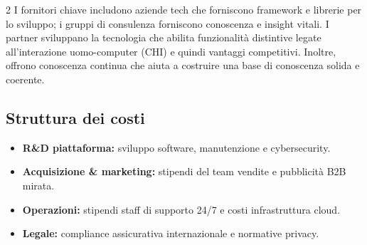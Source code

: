 \documentclass[10pt,a4paper]{scrartcl}
\begin{document}
\begin{multicols*}{2}
I fornitori chiave includono aziende tech che forniscono framework e librerie per lo sviluppo; i gruppi di consulenza forniscono conoscenza e insight vitali. I partner sviluppano la tecnologia che abilita funzionalità distintive legate all’interazione uomo-computer (CHI) e quindi vantaggi competitivi. Inoltre, offrono conoscenza continua che aiuta a costruire una base di conoscenza solida e coerente.

\subsection*{Struttura dei costi}
\begin{itemize}
  \item \textbf{R\&D piattaforma:} sviluppo software, manutenzione e cybersecurity.
  \item \textbf{Acquisizione \& marketing:} stipendi del team vendite e pubblicità B2B mirata.
  \item \textbf{Operazioni:} stipendi staff di supporto 24/7 e costi infrastruttura cloud.
  \item \textbf{Legale:} compliance assicurativa internazionale e normative privacy.
\end{itemize}

\end{multicols*}
\end{document}
